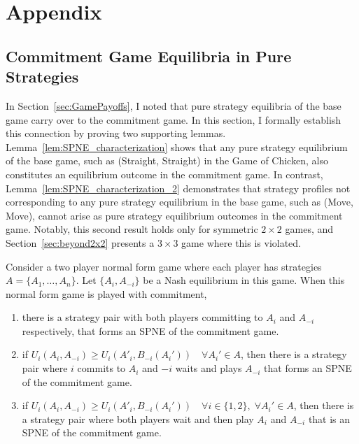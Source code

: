 \documentclass[main.tex]{subfiles}
\begin{document}
\section*{Appendix}
\appendix
{}
\setcounter{subsection}{0}
\renewcommand\thesubsection{\Alph{subsection}}
\subsection{Commitment Game Equilibria in Pure Strategies}\label{sec:proof1}
In Section~\ref{sec:GamePayoffs}, I noted that pure strategy equilibria of the base game carry over to the commitment game. In this section, I formally establish this connection by proving two supporting lemmas. Lemma~\ref{lem:SPNE_characterization} shows that any pure strategy equilibrium of the base game, such as (Straight, Straight) in the Game of Chicken, also constitutes an equilibrium outcome in the commitment game. In contrast, Lemma~\ref{lem:SPNE_characterization_2} demonstrates that strategy profiles not corresponding to any pure strategy equilibrium in the base game, such as (Move, Move), cannot arise as pure strategy equilibrium outcomes in the commitment game. Notably, this second result holds only for symmetric $2\times2$ games, and Section~\ref{sec:beyond2x2} presents a $3\times3$ game where this is violated.
\begin{lemma}[]\label{lem:SPNE_characterization}
    Consider a two player normal form game where each player has strategies $A=\{A_1,\dots,A_n\}$. Let $\{A_i, A_{-i}\}$ be a Nash equilibrium in this game. When this normal form game is played with commitment,
    \begin{enumerate}
        \item there is a strategy pair with both players committing to $A_i$ and $A_{-i}$ respectively, that forms an SPNE of the commitment game.
        
        \item if $U_i(A_i, A_{-i})\geq U_i(A'_i, B_{-i}(A_i'))\quad \forall A_i'\in A$, then there is a strategy pair where $i$ commits to $A_i$ and $-i$ waits and plays $A_{-i}$ that forms an SPNE of the commitment game.
        
        \item if $U_i(A_i, A_{-i})\geq U_i(A'_i, B_{-i}(A_i'))\quad \forall i\in\{1,2\},\; \forall A_i'\in A$, then there is a strategy pair where both players wait and then play $A_i$ and $A_{-i}$ that is an SPNE of the commitment game.
    \end{enumerate}
\end{lemma}
\end{document}
